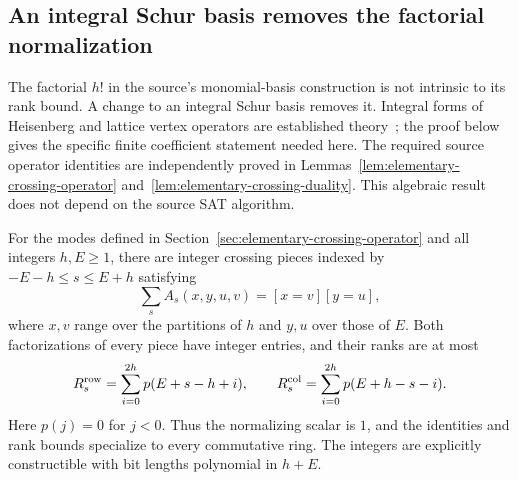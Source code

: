 \subsection{An integral Schur basis removes the factorial normalization}
\label{sec:integral-schur}

The factorial $h!$ in the source's monomial-basis construction is
not intrinsic to its rank bound. A change to an integral Schur
basis removes it. Integral forms of Heisenberg and lattice vertex
operators are established theory~\cite{huangjing2022}; the proof
below gives the specific finite coefficient statement needed here.
The required source operator identities are independently proved
in Lemmas~\ref{lem:elementary-crossing-operator}
and~\ref{lem:elementary-crossing-duality}. This algebraic result
does not depend on the source SAT algorithm.

\begin{theorem}
\label{thm:integral-crossing}
For the modes defined in Section~\ref{sec:elementary-crossing-operator}
and all integers $h,E\ge1$, there are
integer crossing pieces indexed by $-E-h\le s\le E+h$ satisfying
\[
 \sum_s A_s(x,y,u,v)=[x=v][y=u],
\]
where $x,v$ range over the partitions of $h$ and $y,u$ over those
of $E$. Both factorizations of every piece have integer entries,
and their ranks are at most
\[
 R_s^{\rm row}=\sum_{i=0}^{2h}p(E+s-h+i),\qquad
 R_s^{\rm col}=\sum_{i=0}^{2h}p(E+h-s-i).
\]
Here $p(j)=0$ for $j<0$. Thus the normalizing scalar is $1$, and
the identities and rank bounds specialize to every commutative
ring. The integers are explicitly constructible with bit lengths
polynomial in $h+E$.
\end{theorem}

